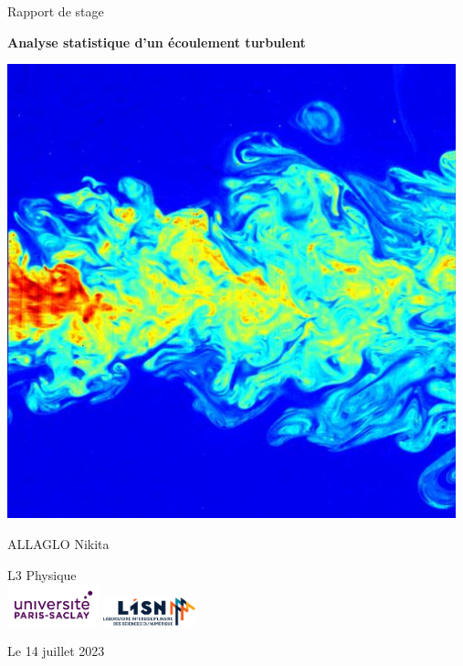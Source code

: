 \documentclass[13pt, a4paper]{extarticle}
\begin{document}
    
\begin{titlepage}
    \begin{center}
  
        {\Huge Rapport de stage}
        
        \vspace{0.2cm}
   
              \centering
        {\huge \bf Analyse statistique d'un écoulement turbulent}
        
        \vspace{2cm}
        \centering
        \includegraphics[width=13cm]{figs/turbulence.jpg}

             \vspace{1.5cm}
              {\huge ALLAGLO Nikita} \\
             
              \vspace{3cm}
 
        {\huge L3 Physique}\\
          \centering
          \includegraphics[width=0.2\textwidth]{figs/logo_PS.jpg} 
          \includegraphics[width=0.2\textwidth]{figs/logo_lisn.png}
              \vspace{1cm}
             
        {\large Le 14 juillet 2023}
  
    \end{center}
 \end{titlepage}
\end{document}
